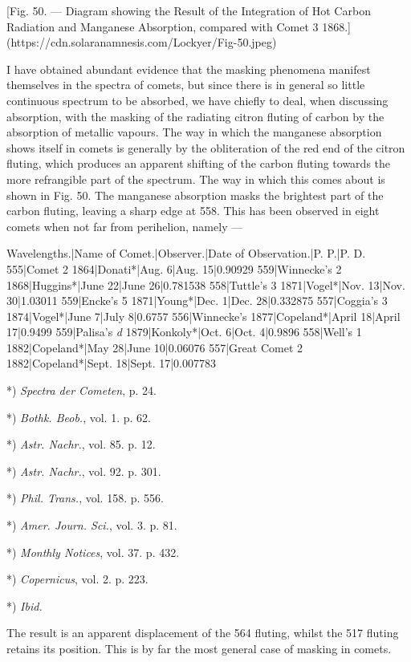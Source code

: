 \documentclass[a4paper, 12pt, oneside, polutonikogreek, english]{article}
\begin{document}
[Fig. 50. --- Diagram showing the Result of the Integration of Hot Carbon Radiation and Manganese Absorption, compared with Comet 3 1868.](https://cdn.solaranamnesis.com/Lockyer/Fig-50.jpeg)

I have obtained abundant evidence that the masking phenomena manifest themselves in the spectra of comets, but since there is in general so little continuous spectrum to be absorbed, we have chiefly to deal, when discussing absorption, with the masking of the radiating citron fluting of carbon by the absorption of metallic vapours. The way in which the manganese absorption shows itself in comets is generally by the obliteration of the red end of the citron fluting, which produces an apparent shifting of the carbon fluting towards the more refrangible part of the spectrum. The way in which this comes about is shown in Fig. 50. The manganese absorption masks the brightest part of the carbon fluting, leaving a sharp edge at 558. This has been observed in eight comets when not far from perihelion, namely ---

Wavelengths.|Name of Comet.|Observer.|Date of Observation.|P. P.|P. D. 
555|Comet 2 1864|Donati*|Aug. 6|Aug. 15|0.90929 
559|Winnecke's 2 1868|Huggins*|June 22|June 26|0.781538 
558|Tuttle's 3 1871|Vogel*|Nov. 13|Nov. 30|1.03011 
559|Encke's 5 1871|Young*|Dec. 1|Dec. 28|0.332875 
557|Coggia's 3 1874|Vogel*|June 7|July 8|0.6757 
556|Winnecke's 1877|Copeland*|April 18|April 17|0.9499 
559|Palisa's \emph{d} 1879|Konkoly*|Oct. 6|Oct. 4|0.9896 
558|Well's 1 1882|Copeland*|May 28|June 10|0.06076 
557|Great Comet 2 1882|Copeland*|Sept. 18|Sept. 17|0.007783

*) \emph{Spectra der Cometen}, p. 24.

*) \emph{Bothk. Beob.}, vol. 1. p. 62.

*) \emph{Astr. Nachr.}, vol. 85. p. 12.

*) \emph{Astr. Nachr.}, vol. 92. p. 301.

*) \emph{Phil. Trans.}, vol. 158. p. 556.

*) \emph{Amer. Journ. Sci.}, vol. 3. p. 81.

*) \emph{Monthly Notices}, vol. 37. p. 432.

*) \emph{Copernicus}, vol. 2. p. 223.

*) \emph{Ibid.}

The result is an apparent displacement of the 564 fluting, whilst the 517 fluting retains its position. This is by far the most general case of masking in comets.
\end{document}
